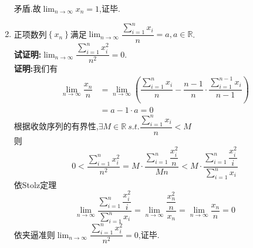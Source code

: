 \documentclass[a4paper,oneside]{ctexart}
\begin{document}
\begin{enumerate}[1.]
            矛盾.故$\displaystyle\lim_{n\to\infty}{x_n}=1$,证毕.
    \newpage
    \item 正项数列$\left\{ x_n\right\}$满足$\displaystyle\lim_{n\to\infty}{\dfrac{\sum_{i=1}^{n}{x_i}}{n}}=a,a\in\mathbb{R}$.\\
          \textbf{试证明:}$\displaystyle\lim_{n\to\infty}{\dfrac{\sum_{i=1}^{n}{x_i^2}}{n^2}}=0$.\\
          \textbf{证明:}我们有
            $$\begin{aligned}
            \lim_{n\to\infty}{\dfrac{x_n}{n}} &= \lim_{n\to\infty}{\left(\dfrac{\sum_{i=1}^{n}{x_i}}{n}-\dfrac{n-1}{n}\cdot\dfrac{\sum_{i=1}^{n-1}{x_i}}{n-1}\right)} \\
                                              &= a-1\cdot a= 0
            \end{aligned}$$
            根据收敛序列的有界性,$\exists M\in\mathbb{R}\ s.t.\dfrac{\sum_{i=1}^{n}{x_i}}{n}<M$\\
            则$$0<\dfrac{\sum_{i=1}^{n}{x_i^2}}{n^2}=M\cdot\dfrac{\sum_{i=1}^{n}{\dfrac{x_i^2}{n}}}{Mn}<M\cdot\dfrac{\sum_{i=1}^{n}{\dfrac{x_i^2}{i}}}{\sum_{i=1}^{n}{x_i}}$$
            依Stolz定理
            $$\lim_{n\to\infty}{\dfrac{\sum_{i=1}^{n}{\dfrac{x_i^2}{i}}}{\sum_{i=1}^{n}{x_i}}}=\lim_{n\to\infty}{\dfrac{\dfrac{x_n^2}{n}}{x_n}}=\lim_{n\to\infty}{\dfrac{x_n}{n}}=0$$
            依夹逼准则$\displaystyle\lim_{n\to\infty}{\dfrac{\sum_{i=1}^{n}{x_i^2}}{n^2}}=0$,证毕.\\
\end{enumerate}
\end{document}
